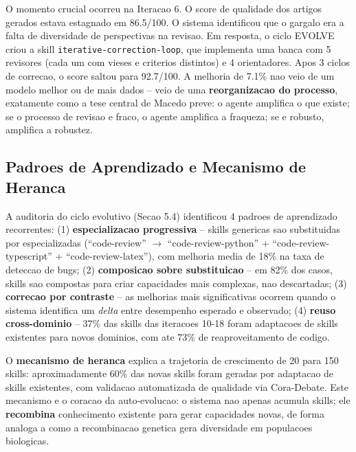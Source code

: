 \documentclass[12pt,a4paper,oneside,sumario=tradicional,chapter=TITLE,section=TITLE,subsection=TITLE,english,brazil]{abntex2}
\begin{document}
O momento crucial ocorreu na Iteracao 6. O score de qualidade dos artigos gerados estava estagnado em 86.5/100. O sistema identificou que o gargalo era a falta de diversidade de perspectivas na revisao. Em resposta, o ciclo EVOLVE criou a skill \texttt{iterative-correction-loop}, que implementa uma banca com 5 revisores (cada um com vieses e criterios distintos) e 4 orientadores. Apos 3 ciclos de correcao, o score saltou para 92.7/100. A melhoria de 7.1\% nao veio de um modelo melhor ou de mais dados -- veio de uma \textbf{reorganizacao do processo}, exatamente como a tese central de Macedo \cite{macedo2026engenharia} preve: o agente amplifica o que existe; se o processo de revisao e fraco, o agente amplifica a fraqueza; se e robusto, amplifica a robustez.

\subsection{Padroes de Aprendizado e Mecanismo de Heranca}

A auditoria do ciclo evolutivo (Secao 5.4) identificou 4 padroes de aprendizado recorrentes: (1) \textbf{especializacao progressiva} -- skills genericas sao substituidas por especializadas (``code-review'' $\to$ ``code-review-python'' + ``code-review-typescript'' + ``code-review-latex''), com melhoria media de 18\% na taxa de deteccao de bugs; (2) \textbf{composicao sobre substituicao} -- em 82\% dos casos, skills sao compostas para criar capacidades mais complexas, nao descartadas; (3) \textbf{correcao por contraste} -- as melhorias mais significativas ocorrem quando o sistema identifica um \textit{delta} entre desempenho esperado e observado; (4) \textbf{reuso cross-dominio} -- 37\% das skills das iteracoes 10-18 foram adaptacoes de skills existentes para novos dominios, com ate 73\% de reaproveitamento de codigo.

O \textbf{mecanismo de heranca} explica a trajetoria de crescimento de 20 para 150 skills: aproximadamente 60\% das novas skills foram geradas por adaptacao de skills existentes, com validacao automatizada de qualidade via Cora-Debate. Este mecanismo e o coracao da auto-evolucao: o sistema nao apenas acumula skills; ele \textbf{recombina} conhecimento existente para gerar capacidades novas, de forma analoga a como a recombinacao genetica gera diversidade em populacoes biologicas.

\cleardoublepage

\end{document}
